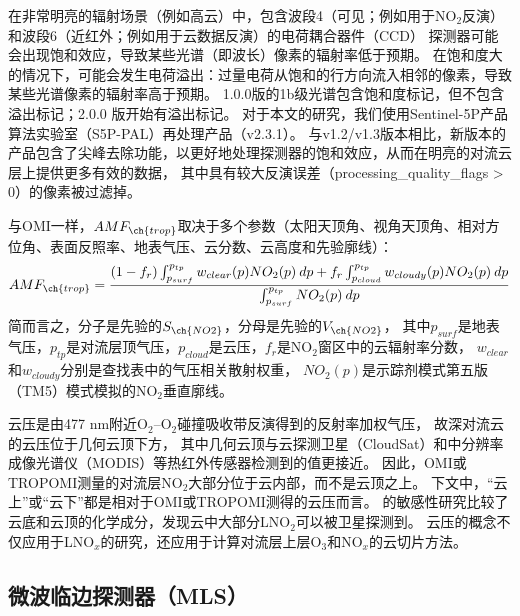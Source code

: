 在非常明亮的辐射场景（例如高云）中，包含波段4（可见；例如用于NO$_2$反演）和波段6（近红外；例如用于云数据反演）的电荷耦合器件（CCD） 探测器可能会出现饱和效应\citep{Ludewig.2020}，导致某些光谱（即波长）像素的辐射率低于预期。
在饱和度大的情况下，可能会发生电荷溢出：过量电荷从饱和的行方向流入相邻的像素，导致某些光谱像素的辐射率高于预期。
1.0.0版的1b级光谱包含饱和度标记，但不包含溢出标记；2.0.0 版开始有溢出标记\citep{Ludewig.2020}。
对于本文的研究，我们使用Sentinel-5P产品算法实验室（S5P-PAL）再处理产品（v2.3.1）。
与v1.2/v1.3版本相比，新版本的产品包含了尖峰去除功能，以更好地处理探测器的饱和效应，从而在明亮的对流云层上提供更多有效的数据\citep{Ludewig.2020,VanGeffen.2022}，
其中具有较大反演误差（processing\_quality\_flags > 0）的像素被过滤掉。

与OMI一样，$AMF_{\ch{trop}}$取决于多个参数（太阳天顶角、视角天顶角、相对方位角、表面反照率、地表气压、云分数、云高度和先验廓线）：
\begin{equation} \label{eq:AMF_NO2}
AMF_{\ch{trop}} = \frac{(1-f_r) \int_{p_{surf}}^{p_{tp}} w_{clear}(p) NO_2(p) \: dp + f_r \int_{p_{cloud}}^{p_{tp}} w_{cloudy}(p) NO_2(p) \: dp}{\int_{p_{surf}}^{p_{tp}} NO_2(p) \: dp}
\end{equation}
简而言之，分子是先验的$S_{\ch{NO2}}$，分母是先验的$V_{\ch{NO2}}$，
其中$p_{surf}$是地表气压，$p_{tp}$是对流层顶气压，$p_{cloud}$是云压，$f_{r}$是NO$_2$窗区中的云辐射率分数，
$w_{clear}$和$w_{cloudy}$分别是查找表中的气压相关散射权重\citep{Lorente.2017}，
$NO_2(p)$是示踪剂模式第五版（TM5）模式模拟的NO$_2$垂直廓线。

云压是由477 nm附近O$_2$--O$_2$碰撞吸收带反演得到的反射率加权气压\citep{Acarreta.2004,Sneep.2008,Stammes.2008}，
故深对流云的云压位于几何云顶下方，
其中几何云顶与云探测卫星（CloudSat）和中分辨率成像光谱仪（MODIS）等热红外传感器检测到的值更接近\citep{Vasilkov.2008,Joiner.2012}。
因此，OMI或TROPOMI测量的对流层NO$_2$大部分位于云内部，而不是云顶之上。
下文中，“云上”或“云下”都是相对于OMI或TROPOMI测得的云压而言。
\citet{Beirle.2009}的敏感性研究比较了云底和云顶的化学成分，发现云中大部分LNO$_2$可以被卫星探测到。
云压的概念不仅应用于LNO$_x$的研究，还应用于计算对流层上层O$_3$和NO$_x$的云切片方法\citep{Ziemke.2009,Choi.2014,Strode.2017,Ziemke.2017,Marais.2018}。


\subsection{微波临边探测器（MLS）}

